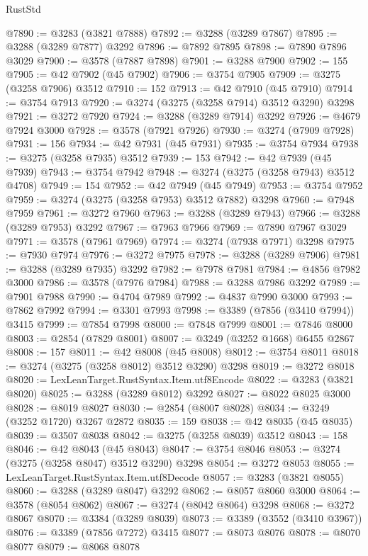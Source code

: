\begin{lexlean}{RustStd}
\begin{coremodule}
@7890 := @3283 (@3821 @7888)
@7892 := @3288 (@3289 @7867)
@7895 := @3288 (@3289 @7877) @3292
@7896 := @7892 @7895
@7898 := @7890 @7896 @3029
@7900 := @3578 (@7887 @7898)
@7901 := @3288 @7900
@7902 := 155
@7905 := @42 @7902 (@45 @7902)
@7906 := @3754 @7905
@7909 := @3275 (@3258 @7906) @3512
@7910 := 152
@7913 := @42 @7910 (@45 @7910)
@7914 := @3754 @7913
@7920 := @3274 (@3275 (@3258 @7914) @3512 @3290) @3298
@7921 := @3272 @7920
@7924 := @3288 (@3289 @7914) @3292
@7926 := @4679 @7924 @3000
@7928 := @3578 (@7921 @7926)
@7930 := @3274 (@7909 @7928)
@7931 := 156
@7934 := @42 @7931 (@45 @7931)
@7935 := @3754 @7934
@7938 := @3275 (@3258 @7935) @3512
@7939 := 153
@7942 := @42 @7939 (@45 @7939)
@7943 := @3754 @7942
@7948 := @3274 (@3275 (@3258 @7943) @3512 @4708)
@7949 := 154
@7952 := @42 @7949 (@45 @7949)
@7953 := @3754 @7952
@7959 := @3274 (@3275 (@3258 @7953) @3512 @7882) @3298
@7960 := @7948 @7959
@7961 := @3272 @7960
@7963 := @3288 (@3289 @7943)
@7966 := @3288 (@3289 @7953) @3292
@7967 := @7963 @7966
@7969 := @7890 @7967 @3029
@7971 := @3578 (@7961 @7969)
@7974 := @3274 (@7938 @7971) @3298
@7975 := @7930 @7974
@7976 := @3272 @7975
@7978 := @3288 (@3289 @7906)
@7981 := @3288 (@3289 @7935) @3292
@7982 := @7978 @7981
@7984 := @4856 @7982 @3000
@7986 := @3578 (@7976 @7984)
@7988 := @3288 @7986 @3292
@7989 := @7901 @7988
@7990 := @4704 @7989
@7992 := @4837 @7990 @3000
@7993 := @7862 @7992
@7994 := @3301 @7993
@7998 := @3389 (@7856 (@3410 @7994)) @3415
@7999 := @7854 @7998
@8000 := @7848 @7999
@8001 := @7846 @8000
@8003 := @2854 (@7829 @8001)
@8007 := @3249 (@3252 @1668) @6455 @2867
@8008 := 157
@8011 := @42 @8008 (@45 @8008)
@8012 := @3754 @8011
@8018 := @3274 (@3275 (@3258 @8012) @3512 @3290) @3298
@8019 := @3272 @8018
@8020 := LexLeanTarget.RustSyntax.Item.utf8Encode
@8022 := @3283 (@3821 @8020)
@8025 := @3288 (@3289 @8012) @3292
@8027 := @8022 @8025 @3000
@8028 := @8019 @8027
@8030 := @2854 (@8007 @8028)
@8034 := @3249 (@3252 @1720) @3267 @2872
@8035 := 159
@8038 := @42 @8035 (@45 @8035)
@8039 := @3507 @8038
@8042 := @3275 (@3258 @8039) @3512
@8043 := 158
@8046 := @42 @8043 (@45 @8043)
@8047 := @3754 @8046
@8053 := @3274 (@3275 (@3258 @8047) @3512 @3290) @3298
@8054 := @3272 @8053
@8055 := LexLeanTarget.RustSyntax.Item.utf8Decode
@8057 := @3283 (@3821 @8055)
@8060 := @3288 (@3289 @8047) @3292
@8062 := @8057 @8060 @3000
@8064 := @3578 (@8054 @8062)
@8067 := @3274 (@8042 @8064) @3298
@8068 := @3272 @8067
@8070 := @3384 (@3289 @8039)
@8073 := @3389 (@3552 (@3410 @3967))
@8076 := @3389 (@7856 @7272) @3415
@8077 := @8073 @8076
@8078 := @8070 @8077
@8079 := @8068 @8078

\end{coremodule}
\end{lexlean}
